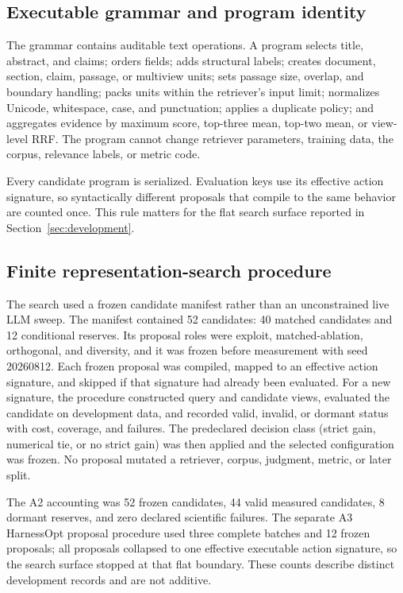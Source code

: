 \documentclass[final,5p,times,twocolumn]{elsarticle}
\begin{document}
\subsection{Executable grammar and program identity}

The grammar contains auditable text operations. A program selects title,
abstract, and claims; orders fields; adds structural labels; creates document,
section, claim, passage, or multiview units; sets passage size, overlap, and
boundary handling; packs units within the retriever's input limit; normalizes
Unicode, whitespace, case, and punctuation; applies a duplicate policy; and
aggregates evidence by maximum score, top-three mean, top-two mean, or
view-level RRF. The program cannot change retriever parameters, training data,
the corpus, relevance labels, or metric code.

Every candidate program is serialized. Evaluation keys use its effective
action signature, so syntactically different proposals that compile to the
same behavior are counted once. This rule matters for the flat search surface
reported in Section~\ref{sec:development}.

\subsection{Finite representation-search procedure}

The search used a frozen candidate manifest rather than an unconstrained live
LLM sweep. The manifest contained 52 candidates: 40 matched candidates and 12
conditional reserves. Its proposal roles were exploit, matched-ablation,
orthogonal, and diversity, and it was frozen before measurement with seed
20260812. Each frozen proposal was compiled, mapped to an effective action
signature, and skipped if that signature had already been evaluated. For a
new signature, the procedure constructed query and candidate views, evaluated
the candidate on development data, and recorded valid, invalid, or dormant
status with cost, coverage, and failures. The predeclared decision class
(strict gain, numerical tie, or no strict gain) was then applied and the
selected configuration was frozen. No proposal mutated a retriever, corpus,
judgment, metric, or later split.

The A2 accounting was 52 frozen candidates, 44 valid measured candidates, 8
dormant reserves, and zero declared scientific failures. The separate A3
HarnessOpt proposal procedure used three complete batches and 12 frozen proposals; all
proposals collapsed to one effective executable action signature, so the
search surface stopped at that flat boundary. These counts describe distinct
development records and are not additive.
\end{document}
